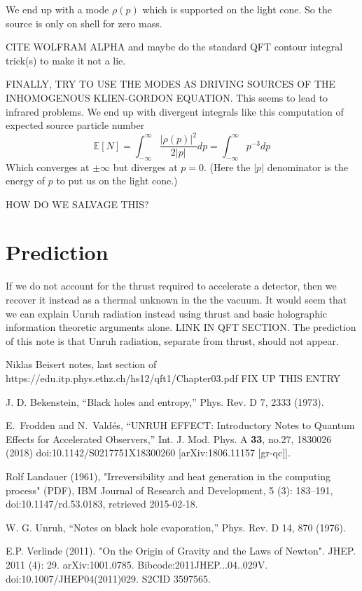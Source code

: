 \documentclass[12pt,a4paper]{article}
\begin{document}
We end up with a mode $\rho(p)$ which is supported on the light cone.  So the source is only on shell for zero mass.

CITE WOLFRAM ALPHA and maybe do the standard QFT contour integral trick(s) to make it not a lie.

FINALLY, TRY TO USE THE MODES AS DRIVING SOURCES OF THE INHOMOGENOUS KLIEN-GORDON EQUATION.  This seems to lead to infrared problems.  We end up with divergent integrals like this computation of expected source particle number \cite{Frodden} 
\[
 \mathbb{E}[N] = \int_{-\infty}^\infty \frac {|\rho(p)|^2}{2|p|} dp = \int_{-\infty}^\infty p^{-3} dp
\]
Which converges at $\pm \infty$ but diverges at $p=0$.  (Here the $|p|$ denominator is the energy of $p$ to put us on the light cone.) 

 
HOW DO WE SALVAGE THIS?


\section{Prediction}
If we do not account for the thrust required to accelerate a detector, then we recover it instead as a thermal unknown in the the vacuum.  It would seem that we can explain Unruh radiation instead using thrust and basic holographic information theoretic arguments alone.  LINK IN QFT SECTION. The prediction of this note is that Unruh radiation, separate from thrust, should not appear.

\begin{thebibliography}{2}

Niklas Beisert notes, last section of 
https://edu.itp.phys.ethz.ch/hs12/qft1/Chapter03.pdf
FIX UP THIS ENTRY

 J. D. Bekenstein, “Black holes and entropy,” Phys. Rev. D 7, 2333 (1973).

E.~Frodden and N.~Vald\'es,
``UNRUH EFFECT: Introductory Notes to Quantum Effects for Accelerated Observers,''
Int. J. Mod. Phys. A \textbf{33}, no.27, 1830026 (2018)
doi:10.1142/S0217751X18300260
[arXiv:1806.11157 [gr-qc]].
  
Rolf Landauer (1961), "Irreversibility and heat generation in the computing process" (PDF), IBM Journal of Research and Development, 5 (3): 183–191, doi:10.1147/rd.53.0183, retrieved 2015-02-18.

W. G. Unruh, “Notes on black hole evaporation,” Phys. Rev. D 14, 870 (1976).

E.P. Verlinde (2011). "On the Origin of Gravity and the Laws of Newton". JHEP. 2011 (4): 29. arXiv:1001.0785. Bibcode:2011JHEP...04..029V. doi:10.1007/JHEP04(2011)029. S2CID 3597565.
\end{thebibliography}
\end{document}
